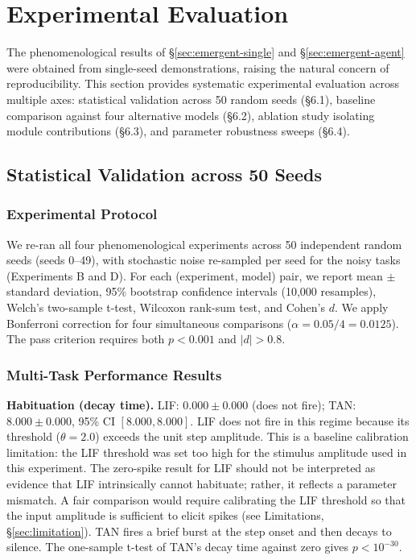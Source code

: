 \section{Experimental Evaluation}\label{sec:evaluation}

The phenomenological results of \S\ref{sec:emergent-single} and \S\ref{sec:emergent-agent} were obtained from single-seed demonstrations, raising the natural concern of reproducibility. This section provides systematic experimental evaluation across multiple axes: statistical validation across 50 random seeds (\S6.1), baseline comparison against four alternative models (\S6.2), ablation study isolating module contributions (\S6.3), and parameter robustness sweeps (\S6.4).

\subsection{Statistical Validation across 50 Seeds}

\subsubsection{Experimental Protocol}

We re-ran all four phenomenological experiments across 50 independent random seeds (seeds 0--49), with stochastic noise re-sampled per seed for the noisy tasks (Experiments B and D). For each (experiment, model) pair, we report mean $\pm$ standard deviation, 95\% bootstrap confidence intervals (10,000 resamples), Welch's two-sample t-test, Wilcoxon rank-sum test, and Cohen's $d$. We apply Bonferroni correction for four simultaneous comparisons ($\alpha = 0.05/4 = 0.0125$). The pass criterion requires both $p < 0.001$ and $|d| > 0.8$.

\subsubsection{Multi-Task Performance Results}

\textbf{Habituation (decay time).} LIF: $0.000 \pm 0.000$ (does not fire); TAN: $\mathbf{8.000 \pm 0.000}$, 95\% CI $[8.000, 8.000]$. LIF does not fire in this regime because its threshold ($\theta = 2.0$) exceeds the unit step amplitude. This is a baseline calibration limitation: the LIF threshold was set too high for the stimulus amplitude used in this experiment. The zero-spike result for LIF should not be interpreted as evidence that LIF intrinsically cannot habituate; rather, it reflects a parameter mismatch. A fair comparison would require calibrating the LIF threshold so that the input amplitude is sufficient to elicit spikes (see Limitations, \S\ref{sec:limitation}). TAN fires a brief burst at the step onset and then decays to silence. The one-sample t-test of TAN's decay time against zero gives $p < 10^{-30}$.

